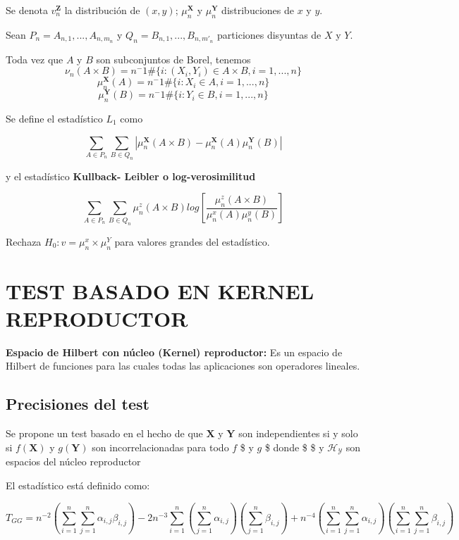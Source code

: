 \documentclass[]{book}
\begin{document}
Se denota \(v_n^{\mathbf{Z}}\) la distribución de \((x,y)\);
\(\mu_n^{\mathbf{X}}\) y \(\mu_n^{\mathbf{Y}}\) distribuciones de \(x\)
y \(y\).

Sean \(P_n ={A_{n,1}, ... , A_{n,m_n}}\) y
\(Q_n ={B_{n,1}, ... , B_{n,m'_n}}\) particiones disyuntas de \(X\) y
\(Y\).

Toda vez que \(A\) y \(B\) son subconjuntos de Borel, tenemos
\[\nu_n(A \times B) = n^-1 \# \{i: (X_i, Y_i) \in A \times B, i = 1,...,n\}\]
\[\mu_n^{\mathbf{X}}(A) = n^-1 \# \{i: X_i \in A , i = 1,...,n\}\]
\[\mu_n^{\mathbf{Y}}(B) = n^-1 \# \{i: Y_i \in  B, i = 1,...,n\}\]

Se define el estadístico \(L_1\) como

\[\displaystyle \sum _{A\in P_n} \sum_{B \in Q_n} |\mu_n^{\mathbf{X}} (A \times B) - \mu_n^{\mathbf{X}}(A)\mu_n^{\mathbf{Y}}(B)|\]

y el estadístico \textbf{Kullback- Leibler o log-verosimilitud}

\[ \displaystyle \sum_{A\in P_n} \sum_{B\in Q_n} \mu_n^z(A \times B) log \left[ \dfrac{\mu_n^z(A \times B)}{{\mu_n^x(A) \mu_n^y(B)}}\right]\]

Rechaza \(H_0 : v= \mu_n^x \times \mu_n^Y\) para valores grandes del
estadístico.

\chapter{TEST BASADO EN KERNEL
REPRODUCTOR}\label{test-basado-en-kernel-reproductor}

\textbf{Espacio de Hilbert con núcleo (Kernel) reproductor:} Es un
espacio de Hilbert de funciones para las cuales todas las aplicaciones
son operadores lineales.

\section{Precisiones del test}\label{precisiones-del-test-2}

Se propone un test basado en el hecho de que \(\mathbf{X}\) y
\(\mathbf{Y}\) son independientes si y solo si \(f(\mathbf{X})\) y
\(g(\mathbf{Y})\) son incorrelacionadas para todo \(f\)
\in {} \$ y \(g\) \in {}\$ donde \$
\$ y \(\mathcal{H_Y}\) son espacios del núcleo reproductor

El estadístico está definido como:

\[T_{GG}= n^{-2} \left( \displaystyle \sum_{i=1}^n \sum_{j=1}^n  \alpha_{i,j} \beta_{i,j} \right) - 2n^{-3} \displaystyle \sum_{i=1}^n \left(  \sum_{j=1}^n \alpha_{i,j}  \right) \left(  \sum_{j=1}^n \beta_{i,j}  \right) +  n^{-4}\left(      
 \displaystyle   \sum_{i=1}^n \sum_{j=1}^n \alpha_{i,j} \right)  \left(     \sum_{i=1}^n  \sum_{j=1} ^n \beta_{i,j}  \right) \]
\end{document}
